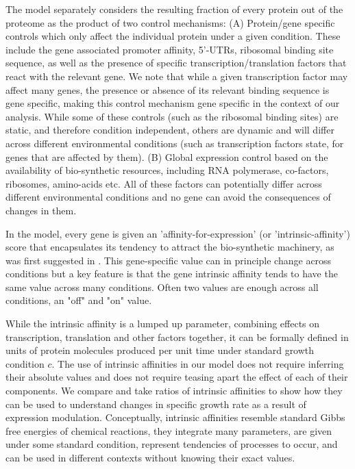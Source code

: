\documentclass[10pt,letterpaper]{article}
\begin{document}
The model separately considers the resulting fraction of every protein out of the proteome as the product of two control mechanisms:
(A) Protein/gene specific controls which only affect the individual protein under a given condition.
These include the gene associated promoter affinity, 5'-UTRs, ribosomal binding site sequence, as well as the presence of specific transcription/translation factors that react with the relevant gene.
We note that while a given transcription factor may affect many genes, the presence or absence of its relevant binding sequence is gene specific, making this control mechanism gene specific in the context of our analysis.
  While some of these controls (such as the ribosomal binding sites) are static, and therefore condition independent, others are dynamic and will differ across different environmental conditions (such as transcription factors state, for genes that are affected by them).
(B) Global expression control based on the availability of bio-synthetic resources, including RNA polymerase, co-factors, ribosomes, amino-acids etc.
  All of these factors can potentially differ across different environmental conditions and no gene can avoid the consequences of changes in them.

In the model, every gene is given an 'affinity-for-expression' (or 'intrinsic-affinity') score that encapsulates its tendency to attract the bio-synthetic machinery, as was first suggested in \cite{Maaloe1969}.
This gene-specific value can in principle change across conditions but a key feature is that the gene intrinsic affinity tends to have the same value across many conditions.
Often two values are enough across all conditions, an "off" and "on" value.

While the intrinsic affinity is a lumped up parameter, combining effects on transcription, translation and other factors together, it can be formally defined in units of protein molecules produced per unit time under standard growth condition $c$.
The use of intrinsic affinities in our model does not require inferring their absolute values and does not require teasing apart the effect of each of their components.
We compare and take ratios of intrinsic affinities to show how they can be used to understand changes in specific growth rate as a result of expression modulation.
Conceptually, intrinsic affinities resemble standard Gibbs free energies of chemical reactions, they integrate many parameters, are given under some standard condition, represent tendencies of processes to occur, and can be used in different contexts without knowing their exact values.
\end{document}
